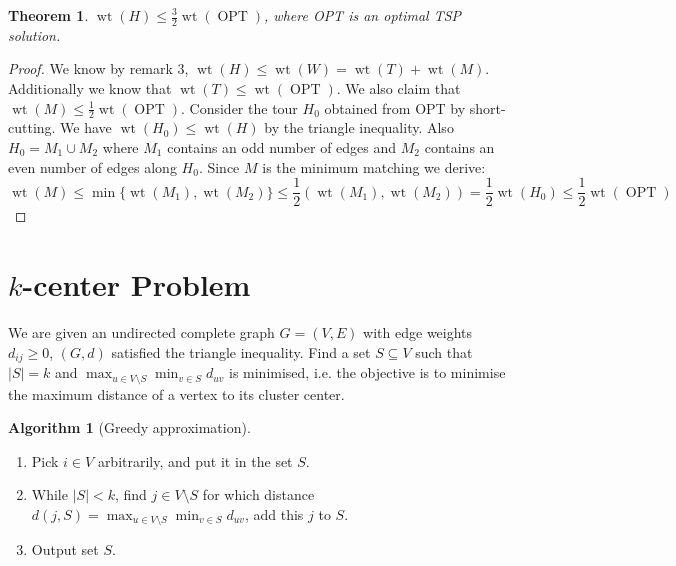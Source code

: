 \documentclass{article}
\newtheorem*{thm}{Theorem}
\theoremstyle{definition}
\newtheorem*{alg}{Algorithm}
\DeclareMathOperator{\wt}{wt}
\DeclareMathOperator{\OPT}{OPT}
\begin{document}
\begin{thm}
$\wt(H)\le\frac{3}{2}\wt(\OPT)$, where OPT is an optimal TSP solution.
\end{thm}
\begin{proof}
We know by remark 3, $\wt(H) \le \wt(W) = \wt(T) + \wt(M)$.
Additionally we know that $\wt(T) \le \wt(\OPT)$. We also claim that $\wt(M) \le \frac{1}{2}\wt(\OPT)$.
Consider the tour $H_0$ obtained from OPT by short-cutting.
We have $\wt(H_0) \le \wt(H)$ by the triangle inequality.
Also $H_0 = M_1\cup M_2$ where $M_1$ contains an odd number of edges and $M_2$ contains an even number of edges along $H_0$.
Since $M$ is the minimum matching we derive:
$$\wt(M) \le \min\{\wt(M_1),\wt(M_2)\} \le \frac{1}{2}(\wt(M_1),\wt(M_2)) = \frac{1}{2}\wt(H_0) \le \frac{1}{2}\wt(\OPT)$$
\end{proof}

\section{$k$-center Problem}
We are given an undirected complete graph $G=(V,E)$ with edge weights $d_{ij} \ge 0$, $(G,d)$ satisfied the triangle inequality.
Find a set $S\subseteq V$ such that $|S| = k$ and $\max_{u\in V\setminus S}\min_{v\in S} d_{uv}$ is minimised, i.e. the objective is to minimise the maximum distance of a vertex to its cluster center.

\begin{alg}[Greedy approximation]~\\
\begin{enumerate}
\item Pick $i\in V$ arbitrarily, and put it in the set $S$.
\item While $|S| < k$, find $j\in V\setminus S$ for which distance $d(j,S) =\max_{u\in V\setminus S}\min_{v\in S} d_{uv}$, add this $j$ to $S$.
\item Output set $S$.
\end{enumerate}
\end{alg}
\end{document}
